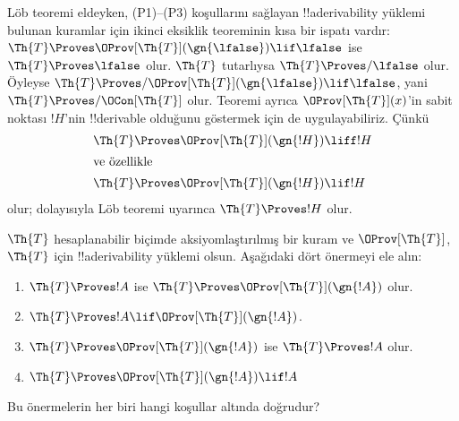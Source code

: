 \documentclass[../../../include/open-logic-section]{subfiles}
\begin{document}
L\"ob teoremi eldeyken, (P1)--(P3) koşullarını sağlayan !!a{derivability}
yüklemi bulunan kuramlar için ikinci eksiklik teoreminin kısa bir ispatı
vardır: $\Th{T} \Proves \OProv[\Th{T}](\gn{\lfalse}) \lif \lfalse$ ise
$\Th{T} \Proves \lfalse$ olur. $\Th{T}$ tutarlıysa
$\Th{T} \Proves/ \lfalse$ olur. Öyleyse
$\Th{T} \Proves/ \OProv[\Th{T}](\gn{\lfalse}) \lif \lfalse$, yani
$\Th{T} \Proves/ \OCon[\Th{T}]$ olur. Teoremi ayrıca
$\OProv[\Th{T}](x)$'in sabit noktası $!H$'nin !!{derivable} olduğunu göstermek
için de uygulayabiliriz. Çünkü
\begin{align*}
  \Th{T} & \Proves \OProv[\Th{T}](\gn{!H}) \liff !H\\
  \intertext{ve özellikle}
    \Th{T} & \Proves \OProv[\Th{T}](\gn{!H}) \lif !H
\end{align*}
olur; dolayısıyla L\"ob teoremi uyarınca $\Th{T} \Proves !H$ olur.


\begin{prob}
$\Th{T}$ hesaplanabilir biçimde aksiyomlaştırılmış bir kuram ve
$\OProv[\Th{T}]$, $\Th{T}$ için !!a{derivability} yüklemi olsun. Aşağıdaki
dört önermeyi ele alın:
\begin{enumerate}
\item $\Th{T} \Proves !A$ ise $\Th{T} \Proves \OProv[\Th{T}](\gn{!A})$ olur.
\item $\Th{T} \Proves !A \lif \OProv[\Th{T}](\gn{!A})$.
\item $\Th{T} \Proves \OProv[\Th{T}](\gn{!A})$ ise $\Th{T} \Proves !A$ olur.
\item $\Th{T} \Proves \OProv[\Th{T}](\gn{!A}) \lif !A$
\end{enumerate}
Bu önermelerin her biri hangi koşullar altında doğrudur?
\end{prob}
\end{document}
